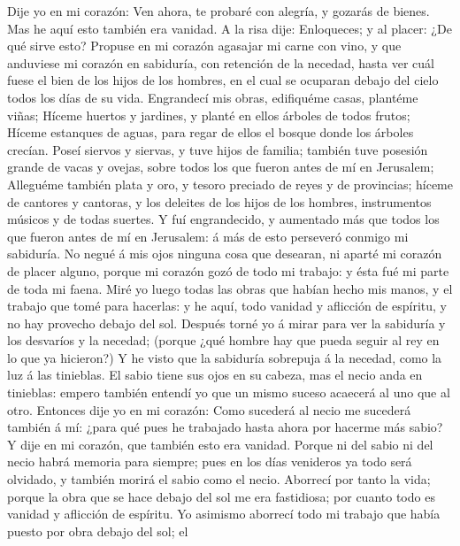  Dije yo en mi corazón: Ven ahora, te probaré con alegría, y
gozarás de bienes. Mas he aquí esto también era vanidad.  A
la risa dije: Enloqueces; y al placer: ¿De qué sirve esto? 
Propuse en mi corazón agasajar mi carne con vino, y que anduviese mi
corazón en sabiduría, con retención de la necedad, hasta ver cuál fuese
el bien de los hijos de los hombres, en el cual se ocuparan debajo del
cielo todos los días de su vida.  Engrandecí mis obras,
edifiquéme casas, plantéme viñas;  Híceme huertos y
jardines, y planté en ellos árboles de todos frutos;  Híceme
estanques de aguas, para regar de ellos el bosque donde los árboles
crecían.  Poseí siervos y siervas, y tuve hijos de familia;
también tuve posesión grande de vacas y ovejas, sobre todos los que
fueron antes de mí en Jerusalem;  Alleguéme también plata y
oro, y tesoro preciado de reyes y de provincias; híceme de cantores y
cantoras, y los deleites de los hijos de los hombres, instrumentos
músicos y de todas suertes.  Y fuí engrandecido, y aumentado
más que todos los que fueron antes de mí en Jerusalem: á más de esto
perseveró conmigo mi sabiduría.  No negué á mis ojos
ninguna cosa que desearan, ni aparté mi corazón de placer alguno, porque
mi corazón gozó de todo mi trabajo: y ésta fué mi parte de toda mi
faena.  Miré yo luego todas las obras que habían hecho mis
manos, y el trabajo que tomé para hacerlas: y he aquí, todo vanidad y
aflicción de espíritu, y no hay provecho debajo del sol. 
Después torné yo á mirar para ver la sabiduría y los desvaríos y la
necedad; (porque ¿qué hombre hay que pueda seguir al rey en lo que ya
hicieron?)  Y he visto que la sabiduría sobrepuja á la
necedad, como la luz á las tinieblas.  El sabio tiene sus
ojos en su cabeza, mas el necio anda en tinieblas: empero también
entendí yo que un mismo suceso acaecerá al uno que al otro.
 Entonces dije yo en mi corazón: Como sucederá al necio me
sucederá también á mí: ¿para qué pues he trabajado hasta ahora por
hacerme más sabio? Y dije en mi corazón, que también esto era vanidad.
 Porque ni del sabio ni del necio habrá memoria para
siempre; pues en los días venideros ya todo será olvidado, y también
morirá el sabio como el necio.  Aborrecí por tanto la vida;
porque la obra que se hace debajo del sol me era fastidiosa; por cuanto
todo es vanidad y aflicción de espíritu.  Yo asimismo
aborrecí todo mi trabajo que había puesto por obra debajo del sol; el
